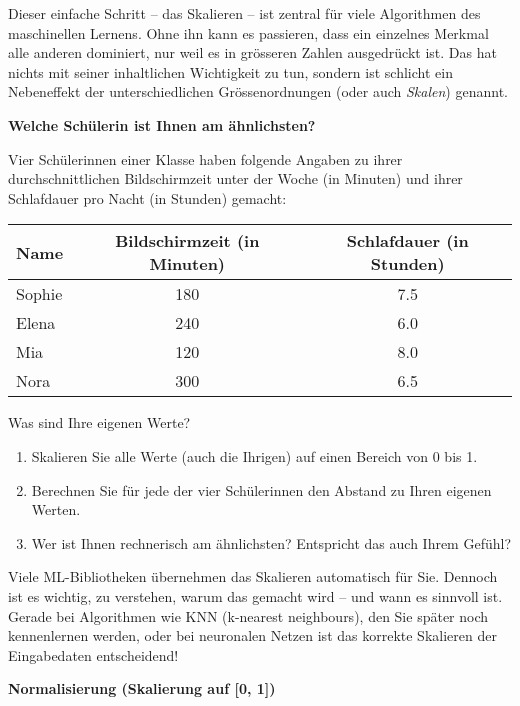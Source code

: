 \begin{lpu}
Dieser einfache Schritt – das Skalieren – ist zentral für viele Algorithmen des maschinellen Lernens. Ohne ihn kann es passieren, dass ein einzelnes Merkmal alle anderen dominiert, nur weil es in grösseren Zahlen ausgedrückt ist. Das hat nichts mit seiner inhaltlichen Wichtigkeit zu tun, sondern ist schlicht ein Nebeneffekt der unterschiedlichen Grössenordnungen (oder auch \textit{Skalen}) genannt.

\begin{aufgabe}{5}
\textbf{Welche Schülerin ist Ihnen am ähnlichsten?}

Vier Schülerinnen einer Klasse haben folgende Angaben zu ihrer durchschnittlichen Bildschirmzeit unter der Woche (in Minuten) und ihrer Schlafdauer pro Nacht (in Stunden) gemacht:

\begin{center}
\begin{tabular}{|l|c|c|}
\hline
\textbf{Name} & \textbf{Bildschirmzeit} (in Minuten) & \textbf{Schlafdauer} (in Stunden) \\
\hline
Sophie & 180 & 7.5 \\
Elena  & 240 & 6.0 \\
Mia    & 120 & 8.0 \\
Nora   & 300 & 6.5 \\
\hline
\end{tabular}
\end{center}

Was sind Ihre eigenen Werte? 

\begin{enumerate}
  \item Skalieren Sie alle Werte (auch die Ihrigen) auf einen Bereich von 0 bis 1.
  \item Berechnen Sie für jede der vier Schülerinnen den Abstand zu Ihren eigenen Werten.
  \item Wer ist Ihnen rechnerisch am ähnlichsten? Entspricht das auch Ihrem Gefühl?
\end{enumerate}

\end{aufgabe}

Viele ML-Bibliotheken übernehmen das Skalieren automatisch für Sie. Dennoch ist es wichtig, zu verstehen, warum das gemacht wird – und wann es sinnvoll ist. Gerade bei Algorithmen wie KNN (k-nearest neighbours), den Sie später noch kennenlernen werden, oder bei neuronalen Netzen ist das korrekte Skalieren der Eingabedaten entscheidend!

\begin{theorie}
\textbf{Normalisierung (Skalierung auf [0, 1])}


\end{theorie}
\end{lpu}
